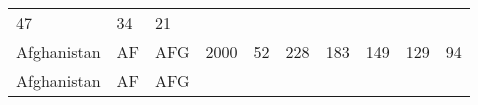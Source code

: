 \documentclass[]{article}
\begin{document}
\begin{longtable}[]{@{}llllllllll@{}}
\begin{minipage}[t]{0.09\columnwidth}
47\strut
\end{minipage} & \begin{minipage}[t]{0.09\columnwidth}\raggedright\strut
34\strut
\end{minipage} & \begin{minipage}[t]{0.09\columnwidth}\raggedright\strut
21\strut
\end{minipage}\tabularnewline
\begin{minipage}[t]{0.08\columnwidth}\raggedright\strut
Afghanistan\strut
\end{minipage} & \begin{minipage}[t]{0.04\columnwidth}\raggedright\strut
AF\strut
\end{minipage} & \begin{minipage}[t]{0.04\columnwidth}\raggedright\strut
AFG\strut
\end{minipage} & \begin{minipage}[t]{0.04\columnwidth}\raggedright\strut
2000\strut
\end{minipage} & \begin{minipage}[t]{0.08\columnwidth}\raggedright\strut
52\strut
\end{minipage} & \begin{minipage}[t]{0.09\columnwidth}\raggedright\strut
228\strut
\end{minipage} & \begin{minipage}[t]{0.09\columnwidth}\raggedright\strut
183\strut
\end{minipage} & \begin{minipage}[t]{0.09\columnwidth}\raggedright\strut
149\strut
\end{minipage} & \begin{minipage}[t]{0.09\columnwidth}\raggedright\strut
129\strut
\end{minipage} & \begin{minipage}[t]{0.09\columnwidth}\raggedright\strut
94\strut
\end{minipage}\tabularnewline
\begin{minipage}[t]{0.08\columnwidth}\raggedright\strut
Afghanistan\strut
\end{minipage} & \begin{minipage}[t]{0.04\columnwidth}\raggedright\strut
AF\strut
\end{minipage} & \begin{minipage}[t]{0.04\columnwidth}\raggedright\strut
AFG\strut
\end{minipage} & \begin{minipage}[t]{0.04\columnwidth}\raggedright\strut

\end{minipage}
\end{longtable}
\end{document}
